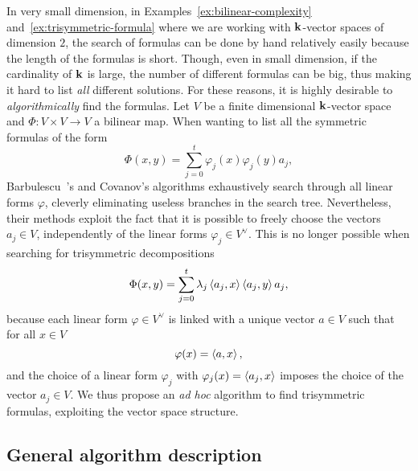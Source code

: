 In very small dimension, \eg in Examples~\ref{ex:bilinear-complexity}
and~\ref{ex:trisymmetric-formula} where we are working with $\mathbf{k}$-vector spaces
of dimension $2$, the search of formulas can be done by hand relatively easily
because the length of the formulas is short. Though, even in small dimension, if
the cardinality of $\mathbf{k}$ is large, the number of different formulas can be
big, thus making it hard to list \emph{all} different solutions. For these
reasons, it is highly desirable to \emph{algorithmically} find the formulas.
Let $V$ be a finite dimensional $\mathbf{k}$-vector space and $\Phi:V\times V\to V$ a bilinear map.
When wanting to list all the symmetric formulas of the form
\[
  \Phi(x, y) = \sum_{j=0}^t\varphi_j(x)\varphi_j(y)a_j,
\]
Barbulescu~\etal\!\!\!'s and Covanov's algorithms exhaustively search through
all linear forms $\varphi$, cleverly eliminating useless branches in the search
tree. Nevertheless, their methods exploit the fact that it is possible to freely
choose the vectors $a_j\in V$, independently of the linear forms $\varphi_j\in
V^\vee$. This is
no longer possible when searching for trisymmetric decompositions
\[
  \Phi(x, y) = \sum_{j=0}^t\lambda_j\left\langle a_j,x\right\rangle\left\langle a_j,y\right\rangle a_j,
\]
because each
linear form $\varphi\in V^\vee$ is linked with a unique vector $a\in V$ such
that for all $x\in V$
\[
  \varphi(x) = \left\langle a,x\right\rangle,
\]
and the choice of a linear form $\varphi_j$ with $\varphi_j(x)=\left\langle a_j,x\right\rangle$
imposes the choice of the vector $a_j\in V$. We thus propose an \emph{ad hoc}
algorithm to find trisymmetric formulas, exploiting the vector space structure.

\subsection{General algorithm description}
\label{sec:general-algorithm}

